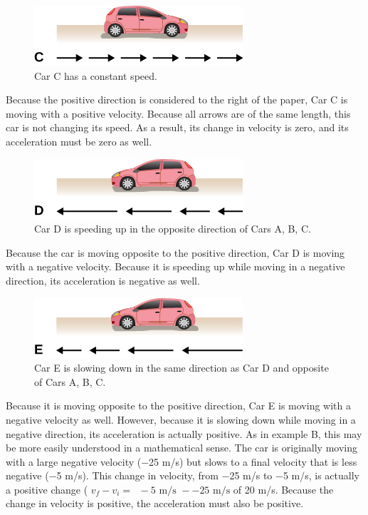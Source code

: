 \documentclass[
]{book}
\newenvironment{note}{}{}
\begin{document}
\begin{note}
\begin{figure}
\hypertarget{fs-id2186010}{%
\centering
\includegraphics{images/Figure_Ch2_M4_04.jpg}
\caption{Car C has a constant
speed.}\label{fs-id2186010}
}
\end{figure}

Because the positive direction is considered to the right of the paper,
Car C is moving with a positive velocity. Because all arrows are of the
same length, this car is not changing its speed. As a result, its change
in velocity is zero, and its acceleration must be zero as well.

\begin{figure}
\hypertarget{fs-id2672786}{%
\centering
\includegraphics{images/Figure_Ch2_M4_05.jpg}
\caption{Car D is speeding up in the opposite direction of Cars A, B,
C.}\label{fs-id2672786}
}
\end{figure}

Because the car is moving opposite to the positive direction, Car D is
moving with a negative velocity. Because it is speeding up while moving
in a negative direction, its acceleration is negative as well.

\begin{figure}
\hypertarget{fs-id1956758}{%
\centering
\includegraphics{images/Figure_Ch2_M4_06.jpg}
\caption{Car E is slowing down in the same direction as Car D and opposite of
Cars A, B, C.}\label{fs-id1956758}
}
\end{figure}

Because it is moving opposite to the positive direction, Car E is moving
with a negative velocity as well. However, because it is slowing down
while moving in a negative direction, its acceleration is actually
positive. As in example B, this may be more easily understood in a
mathematical sense. The car is originally moving with a large negative
velocity (−25 m/s) but slows to a final velocity that is less negative
(−5 m/s). This change in velocity, from −25 m/s to −5 m/s, is actually a
positive change (
\(v_{f} - v_{i} = \operatorname{} - 5\text{~m/s~} - - 25\text{~m/s}\) of
20 m/s. Because the change in velocity is positive, the acceleration
must also be positive.

\end{note}
\end{document}
